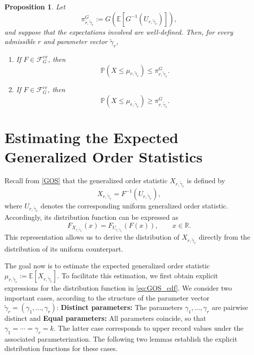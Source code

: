 \documentclass[authoryear,preprint,3p,review,10pt]{elsarticle}
\newtheorem{proposition}[theorem]{Proposition}
\theoremstyle{definition}
\begin{document}
	\begin{proposition}\label{prop}
		Let
		\[
		\pi_{r,\tilde{\gamma}_r}^{G}
		:=
		G\!\left(
		\mathbb{E}\!\left[
		G^{-1}(U_{r,\tilde{\gamma}_r})
		\right]\right),
		\]
		and suppose that the expectations involved are well-defined. Then, for every admissible \(r\) and parameter vector \(\tilde{\gamma}_r\),
		\begin{enumerate}
			\item If \(F\in\mathcal{F}_G^{cx}\), then
			\[
			\mathbb{P}\!\left(
			X\leq\mu_{r,\tilde{\gamma}_r}
			\right)
			\leq
			\pi_{r,\tilde{\gamma}_r}^{G}.
			\]
			
			\item If \(F\in\mathcal{F}_G^{cv}\), then
			\[
			\mathbb{P}\!\left(
			X\leq\mu_{r,\tilde{\gamma}_r}
			\right)
			\geq
			\pi_{r,\tilde{\gamma}_r}^{G}.
			\]
		\end{enumerate}
	\end{proposition}
	
	
	
	
	
	
	\section{Estimating the Expected Generalized Order Statistics}
	
	
	
	Recall from \eqref{GOS} that the generalized order statistic
	\(X_{r,\tilde{\gamma}_r}\) is defined by
	\[
	X_{r,\tilde{\gamma}_r}
	=F^{-1}\!\left(U_{r,\tilde{\gamma}_r}\right),
	\]
	where \(U_{r,\tilde{\gamma}_r}\) denotes the corresponding uniform generalized order statistic. Accordingly, its distribution function can be expressed as
	\begin{equation}\label{eq:GOS_cdf}
		F_{X_{r,\tilde{\gamma}_r}}(x)
		=F_{U_{r,\tilde{\gamma}_r}}\!\left(F(x)\right),
		\qquad x\in\mathbb{R}.
	\end{equation}
	This representation allows us to derive the distribution of
	\(X_{r,\tilde{\gamma}_r}\) directly from the distribution of its
	uniform counterpart.
	
	The goal now is to estimate the expected generalized order statistic $\mu_{r,\tilde{\gamma}_r}
	:=\mathbb{E}\!\left[X_{r,\tilde{\gamma}_r}\right].$ To facilitate this estimation, we first obtain explicit expressions for the distribution function in \eqref{eq:GOS_cdf}. We consider two important cases, according to the structure of the parameter vector \(\tilde{\gamma}_r=(\gamma_1,\ldots,\gamma_r)\): \textbf{Distinct parameters:}
	The parameters \(\gamma_1,\ldots,\gamma_r\) are pairwise distinct and \textbf{Equal parameters:}
	All parameters coincide, so that
	\(\gamma_1=\cdots=\gamma_r=k\). The latter case corresponds to upper
	record values under the associated parameterization. The following two lemmas establish the explicit distribution functions
	for these cases. 
	
\end{document}
